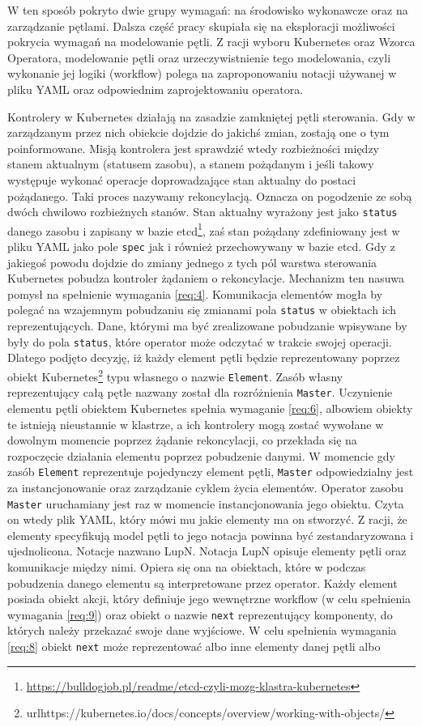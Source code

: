 W ten sposób pokryto dwie grupy wymagań: na środowisko wykonawcze oraz na zarządzanie pętlami. Dalsza część pracy skupiała się na eksploracji możliwości pokrycia wymagań na modelowanie pętli. Z racji wyboru Kubernetes oraz Wzorca Operatora, modelowanie pętli oraz urzeczywistnienie tego modelowania, czyli wykonanie jej logiki (workflow) polega na zaproponowaniu notacji używanej w pliku YAML oraz odpowiednim zaprojektowaniu operatora. 

Kontrolery w Kubernetes działają na zasadzie zamkniętej pętli sterowania. Gdy w zarządzanym przez nich obiekcie dojdzie do jakichś zmian, zostają one o tym poinformowane. Misją kontrolera jest sprawdzić wtedy rozbieżności między stanem aktualnym (statusem zasobu), a stanem pożądanym i jeśli takowy występuje wykonać operacje doprowadzające stan aktualny do postaci pożądanego. Taki proces nazywamy rekoncylacją. Oznacza on pogodzenie ze sobą dwóch chwilowo rozbieżnych stanów. Stan aktualny wyrażony jest jako \texttt{status} danego zasobu i zapisany w bazie etcd\footnote{\url{https://bulldogjob.pl/readme/etcd-czyli-mozg-klastra-kubernetes}}, zaś stan pożądany zdefiniowany jest w pliku YAML jako pole \texttt{spec} jak i również przechowywany w bazie etcd. Gdy z jakiegoś powodu dojdzie do zmiany jednego z tych pól warstwa sterowania Kubernetes pobudza kontroler żądaniem o rekoncylacje. Mechanizm ten nasuwa pomysł na spełnienie wymagania \ref{req:4}. Komunikacja elementów mogła by polegać na wzajemnym pobudzaniu się zmianami pola \texttt{status} w obiektach ich reprezentujących. Dane, którymi ma być zrealizowane pobudzanie wpisywane by były do pola \texttt{status}, które operator może odczytać w trakcie swojej operacji. Dlatego podjęto decyzję, iż każdy element pętli będzie reprezentowany poprzez obiekt Kubernetes\footnote{url{https://kubernetes.io/docs/concepts/overview/working-with-objects/}} typu własnego o nazwie \texttt{Element}. Zasób własny reprezentujący całą pętle nazwany został dla rozróżnienia \texttt{Master}. Uczynienie elementu pętli obiektem Kubernetes spełnia wymaganie \ref{req:6}, albowiem obiekty te istnieją nieustannie w klastrze, a ich kontrolery mogą zostać wywołane w dowolnym momencie poprzez żądanie rekoncylacji, co przekłada się na rozpoczęcie działania elementu poprzez pobudzenie danymi. W momencie gdy zasób \texttt{Element} reprezentuje pojedynczy element pętli, \texttt{Master} odpowiedzialny jest za instancjonowanie oraz zarządzanie cyklem życia elementów. Operator zasobu \texttt{Master} uruchamiany jest raz w momencie instancjonowania jego obiektu. Czyta on wtedy plik YAML, który mówi mu jakie elementy ma on stworzyć. Z racji, że elementy specyfikują model pętli to jego notacja powinna być zestandaryzowana i ujednolicona. Notacje nazwano LupN. Notacja LupN opisuje elementy pętli oraz komunikacje między nimi. Opiera się ona na obiektach, które w podczas pobudzenia danego elementu są interpretowane przez operator. Każdy element posiada obiekt akcji, który definiuje jego wewnętrzne workflow (w celu spełnienia wymagania \ref{req:9}) oraz obiekt o nazwie \texttt{next} reprezentujący komponenty, do których należy przekazać swoje dane wyjściowe. W celu spełnienia wymagania \ref{req:8} obiekt \texttt{next} może reprezentować albo inne elementy danej pętli albo 